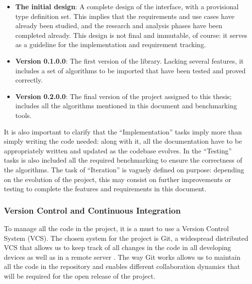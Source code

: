 \begin{itemize}
\item \textbf{The initial design}: A complete design of the interface, with a
  provisional type definition set. This implies that the requirements and use
  cases have already been studied, and the research and analysis phases have
  been completed already. This design is not final and immutable, of course:
  it serves as a guideline for the implementation and requirement tracking.
\item \textbf{Version 0.1.0.0}: The first version of the library. Lacking
  several features, it includes a set of algorithms to be imported that have
  been tested and proved correctly.
\item \textbf{Version 0.2.0.0}: The final version of the project assigned to
  this thesis; includes all the algorithms mentioned in this document and
  benchmarking tools.
\end{itemize}

It is also important to clarify that the ``Implementation'' tasks imply more
than simply writing the code needed: along with it, all the documentation have
to be appropriately written and updated as the codebase evolves. In the
``Testing'' tasks is also included all the required benchmarking to ensure the
correctness of the algorithms. The task of ``Iteration'' is vaguely defined on
purpose: depending on the evolution of the project, this may consist on further
improvements or testing to complete the features and requirements in this
document.\\

\subsubsection{Version Control and Continuous Integration}

To manage all the code in the project, it is a must to use a Version Control
System (VCS). The chosen system for the project is Git, a widespread
distributed VCS that allows us to keep track of all changes in the code in all
developing devices as well as in a remote server \cite{chacon-2009-git}. The
way Git works allows us to maintain all the code in the repository and enables
different collaboration dynamics that will be required for the open release of
the project.\\

